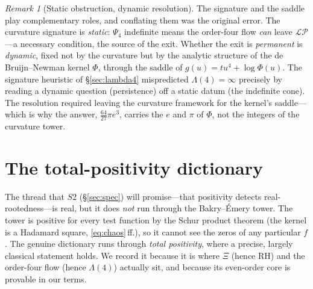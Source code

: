 \documentclass[11pt,reqno]{amsart}
\theoremstyle{plain}
\theoremstyle{definition}
\theoremstyle{remark}
\newtheorem{remark}[theorem]{Remark}
\newcommand{\LP}{\mathcal{LP}}
\begin{document}
\begin{remark}[Static obstruction, dynamic resolution]\label{rem:static-dynamic}
The signature and the saddle play complementary roles, and conflating them
was the original error. The curvature signature is \emph{static}: $\Psi_4$
indefinite means the order-four flow \emph{can} leave $\LP$---a necessary
condition, the source of the exit. Whether the exit is \emph{permanent} is
\emph{dynamic}, fixed not by the curvature but by the analytic structure of
the de Bruijn--Newman kernel $\Phi$, through the saddle of
$g(u)=tu^4+\log\Phi(u)$. The signature heuristic of \S\ref{sec:lambda4}
mispredicted $\Lambda(4)=\infty$ precisely by reading a dynamic question
(persistence) off a static datum (the indefinite cone). The resolution
required leaving the curvature framework for the kernel's saddle---which is
why the answer, $\tfrac{64}{27}\pi e^3$, carries the $e$ and $\pi$ of
$\Phi$, not the integers of the curvature tower.
\end{remark}

\section{The total-positivity dictionary}\label{sec:dict}

The thread that $S2$ (\S\ref{sec:spec}) will promise---that positivity
detects real-rootedness---is real, but it does \emph{not} run through the
Bakry--\'Emery tower. The tower is positive for every test function by
the Schur product theorem (the kernel is a Hadamard square,
\eqref{eq:chaos}\,ff.), so it cannot see the zeros of any particular
$f$. The genuine dictionary runs through \emph{total positivity}, where a
precise, largely classical statement holds. We record it because it is
where $\Xi$ (hence RH) and the order-four flow (hence $\Lambda(4)$)
actually sit, and because its even-order core is provable in our terms.
\end{document}
